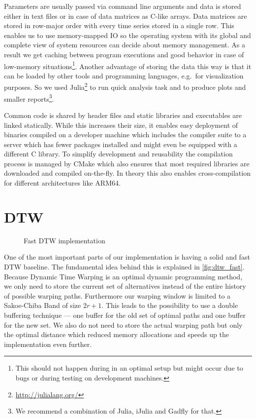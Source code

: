Parameters are usually passed via command line arguments and data is stored either in text files or in case of data matrices as C-like arrays. Data matrices are stored in row-major order with every time series stored in a single row. This enables us to use memory-mapped IO so the operating system with its global and complete view of system resources can decide about memory management. As a result we get caching between program executions and good behavior in case of low-memory situations\footnote{This should not happen during in an optimal setup but might occur due to bugs or during testing on development machines.}. Another advantage of storing the data this way is that it can be loaded by other tools and programming languages, e.g.\ for visualization purposes. So we used Julia\footnote{\url{http://julialang.org/}} to run quick analysis task and to produce plots and smaller reports\footnote{We recommend a combination of Julia, iJulia and Gadfly for that.}.

Common code is shared by header files and static libraries and executables are linked statically. While this increases their size, it enables easy deployment of binaries compiled on a developer machine which includes the compiler suite to a server which has fewer packages installed and might even be equipped with a different C library. To simplify development and reusability the compilation process is managed by CMake which also ensures that most required libraries are downloaded and compiled on-the-fly. In theory this also enables cross-compilation for different architectures like ARM64.



\section{DTW}
\label{sec:implementation:dtw}

\begin{figure}
    \centering
    
    \caption{Fast DTW implementation}\label{fig:dtw_fast}
\end{figure}

One of the most important parts of our implementation is having a solid and fast DTW baseline. The fundamental idea behind this is explained in \autoref{fig:dtw_fast}. Because Dynamic Time Warping is an optimal dynamic programming method, we only need to store the current set of alternatives instead of the entire history of possible warping paths. Furthermore our warping window is limited to a Sakoe-Chiba Band of size $2r + 1$. This leads to the possibility to use a double buffering technique --- one buffer for the old set of optimal paths and one buffer for the new set. We also do not need to store the actual warping path but only the optimal distance which reduced memory allocations and speeds up the implementation even further.

